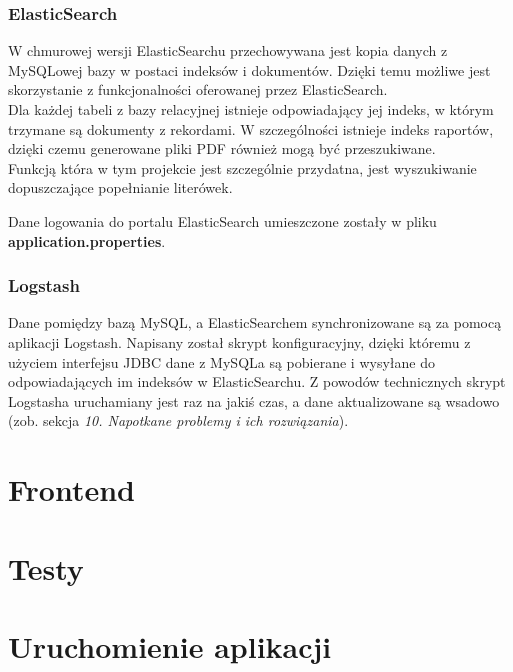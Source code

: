 \documentclass[]{article}
\begin{document}
    \subsubsection{ElasticSearch}
    W chmurowej wersji ElasticSearchu przechowywana jest kopia danych z MySQLowej bazy w postaci indeksów i dokumentów. Dzięki temu możliwe jest skorzystanie z funkcjonalności oferowanej przez ElasticSearch. \\
    Dla każdej tabeli z bazy relacyjnej istnieje odpowiadający jej indeks, w którym trzymane są dokumenty z rekordami. W szczególności istnieje indeks raportów, dzięki czemu generowane pliki PDF również mogą być przeszukiwane. \\ Funkcją która w tym projekcie jest szczególnie przydatna, jest wyszukiwanie dopuszczające popełnianie literówek.

    \bigskip
    Dane logowania do portalu ElasticSearch umieszczone zostały w pliku \textbf{application.properties}.

    \subsubsection{Logstash}
    Dane pomiędzy bazą MySQL, a ElasticSearchem synchronizowane są za pomocą aplikacji Logstash. Napisany został skrypt konfiguracyjny, dzięki któremu z użyciem interfejsu JDBC dane z MySQLa są pobierane i wysyłane do odpowiadających im indeksów w ElasticSearchu. Z powodów technicznych skrypt Logstasha uruchamiany jest raz na jakiś czas, a dane aktualizowane są wsadowo (zob. sekcja \textit{10. Napotkane problemy i ich rozwiązania}).

    \section{Frontend}

    \section{Testy}

    \section{Uruchomienie aplikacji}
\end{document}

